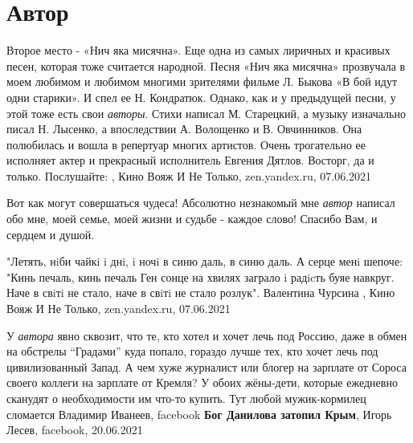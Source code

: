  
 
 
 
 
\chapter{Автор}
\label{sec:slova.avtor}

Второе место - «Нич яка мисячна». Еще одна из самых лиричных и красивых песен,
которая тоже считается народной. Песня «Нич яка мисячна» прозвучала в моем
любимом и любимом многими зрителями фильме Л. Быкова «В бой идут одни старики».
И спел ее Н. Кондратюк. Однако, как и у предыдущей песни, у этой тоже есть свои
\emph{авторы}. Стихи написал М. Старецкий, а музыку изначально писал Н. Лысенко, а
впоследствии А. Волощенко и В. Овчинников.  Она полюбилась и вошла в репертуар
многих артистов. Очень трогательно ее исполняет актер и прекрасный исполнитель
Евгения Дятлов. Восторг, да и только. Послушайте:
, 
Кино Вояж И Не Только, zen.yandex.ru, 07.06.2021

Вот как могут совершаться чудеса! Абсолютно незнакомый мне \emph{автор} написал
обо мне, моей семье, моей жизни и судьбе - каждое слово! Спасибо Вам, и сердцем
и душой.

"Летять, нiби чайкi i днi, i ночi
в синю даль, в синю даль.
А серце менi шепоче: "Кинь печаль, кинь печаль
Ген сонце на хвилях заграло
i радicть буяе навкруг.
Наче в свiтi не стало, наче в свiтi не стало розлук".
Валентина Чурсина
, 
Кино Вояж И Не Только, zen.yandex.ru, 07.06.2021

У \emph{автора} явно сквозит, что те, кто хотел и хочет лечь под Россию, даже в обмен
на обстрелы \enquote{Градами} куда попало, гораздо лучше тех, кто хочет лечь под
цивилизованный Запад. А чем хуже журналист или блогер на зарплате от Сороса
своего коллеги на зарплате от Кремля? У обоих жёны-дети, которые ежедневно
сканудят о необходимости им что-то купить. Тут любой мужик-кормилец сломается
Владимир Иванеев, facebook
\textbf{Бог Данилова затопил Крым}, Игорь Лесев, facebook, 20.06.2021


